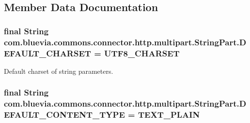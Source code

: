 \subsection{Member Data Documentation}
\hypertarget{classcom_1_1bluevia_1_1commons_1_1connector_1_1http_1_1multipart_1_1StringPart_aa64e5f2887780dfa70466cffc3511603}{
\subsubsection[{DEFAULT\_\-CHARSET}]{\setlength{\rightskip}{0pt plus 5cm}final String {\bf com.bluevia.commons.connector.http.multipart.StringPart.DEFAULT\_\-CHARSET} = UTF8\_\-CHARSET}}
\label{classcom_1_1bluevia_1_1commons_1_1connector_1_1http_1_1multipart_1_1StringPart_aa64e5f2887780dfa70466cffc3511603}
Default charset of string parameters. \hypertarget{classcom_1_1bluevia_1_1commons_1_1connector_1_1http_1_1multipart_1_1StringPart_a8b6049a4dbe20fbc395328e4a7682407}{
\subsubsection[{DEFAULT\_\-CONTENT\_\-TYPE}]{\setlength{\rightskip}{0pt plus 5cm}final String {\bf com.bluevia.commons.connector.http.multipart.StringPart.DEFAULT\_\-CONTENT\_\-TYPE} = TEXT\_\-PLAIN}}
\label{classcom_1_1bluevia_1_1commons_1_1connector_1_1http_1_1multipart_1_1StringPart_a8b6049a4dbe20fbc395328e4a7682407}
